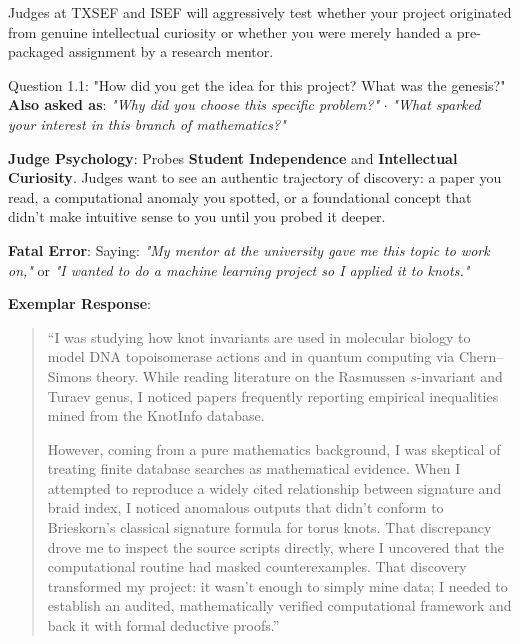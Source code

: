 \documentclass[11pt,letterpaper]{article}
\begin{document}
Judges at TXSEF and ISEF will aggressively test whether your project originated from genuine intellectual curiosity or whether you were merely handed a pre-packaged assignment by a research mentor.

\begin{questionbox}{Question 1.1: "How did you get the idea for this project? What was the genesis?"}
\textbf{Also asked as}: \textit{"Why did you choose this specific problem?"} $\cdot$ \textit{"What sparked your interest in this branch of mathematics?"}
\end{questionbox}

\begin{strategybox}
\textbf{Judge Psychology}: Probes \textbf{Student Independence} and \textbf{Intellectual Curiosity}. Judges want to see an authentic trajectory of discovery: a paper you read, a computational anomaly you spotted, or a foundational concept that didn't make intuitive sense to you until you probed it deeper.
\end{strategybox}

\begin{trapbox}
\textbf{Fatal Error}: Saying: \textit{"My mentor at the university gave me this topic to work on,"} or \textit{"I wanted to do a machine learning project so I applied it to knots."}
\end{trapbox}

\begin{exemplarbox}
\textbf{Exemplar Response}:
\begin{quote}
``I was studying how knot invariants are used in molecular biology to model DNA topoisomerase actions and in quantum computing via Chern--Simons theory. While reading literature on the Rasmussen $s$-invariant and Turaev genus, I noticed papers frequently reporting empirical inequalities mined from the KnotInfo database. 

However, coming from a pure mathematics background, I was skeptical of treating finite database searches as mathematical evidence. When I attempted to reproduce a widely cited relationship between signature and braid index, I noticed anomalous outputs that didn't conform to Brieskorn's classical signature formula for torus knots. That discrepancy drove me to inspect the source scripts directly, where I uncovered that the computational routine had masked counterexamples. That discovery transformed my project: it wasn't enough to simply mine data; I needed to establish an audited, mathematically verified computational framework and back it with formal deductive proofs.''
\end{quote}
\end{exemplarbox}
\end{document}
